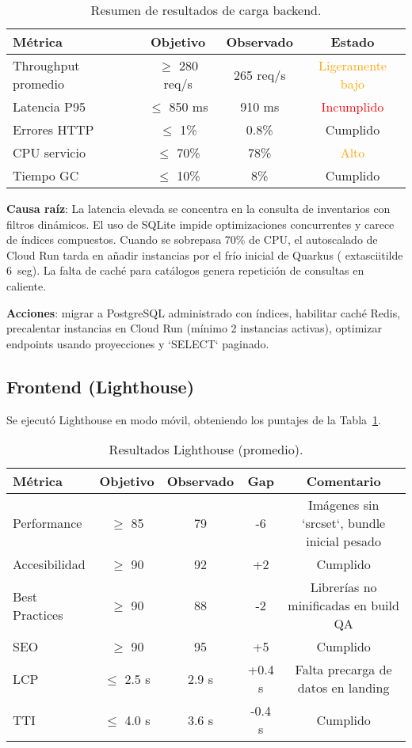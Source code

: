 \documentclass[12pt,letterpaper]{article}
\begin{document}
\begin{table}[H]
  \centering
  \caption{Resumen de resultados de carga backend.}
  \begin{tabular}{lccc}
    \toprule
    Métrica & Objetivo & Observado & Estado \\
    \midrule
    Throughput promedio & $\geq$ 280 req/s & 265 req/s & \textcolor{orange}{Ligeramente bajo} \\
    Latencia P95 & $\leq$ 850 ms & 910 ms & \textcolor{red}{Incumplido} \\
    Errores HTTP & $\leq$ 1\% & 0.8\% & \textcolor{green!60!black}{Cumplido} \\
    CPU servicio & $\leq$ 70\% & 78\% & \textcolor{orange}{Alto} \\
    Tiempo GC & $\leq$ 10\% & 8\% & \textcolor{green!60!black}{Cumplido} \\
    \bottomrule
  \end{tabular}
\end{table}

\textbf{Causa raíz}: La latencia elevada se concentra en la consulta de inventarios con filtros dinámicos. El uso de SQLite impide optimizaciones concurrentes y carece de índices compuestos. Cuando se sobrepasa 70\% de CPU, el autoscalado de Cloud Run tarda en añadir instancias por el frío inicial de Quarkus (	extasciitilde 6~seg). La falta de caché para catálogos genera repetición de consultas en caliente.

\textbf{Acciones}: migrar a PostgreSQL administrado con índices, habilitar caché Redis, precalentar instancias en Cloud Run (mínimo 2 instancias activas), optimizar endpoints usando proyecciones y `SELECT` paginado.

\subsection{Frontend (Lighthouse)}
Se ejecutó Lighthouse en modo móvil, obteniendo los puntajes de la Tabla~\ref{tab:lighthouse}.

\begin{table}[H]
  \centering
  \caption{Resultados Lighthouse (promedio).}\label{tab:lighthouse}
  \begin{tabular}{lcccc}
    \toprule
    Métrica & Objetivo & Observado & Gap & Comentario \\
    \midrule
    Performance & $\geq$ 85 & 79 & -6 & Imágenes sin `srcset`, bundle inicial pesado \\
    Accesibilidad & $\geq$ 90 & 92 & +2 & Cumplido \\
    Best Practices & $\geq$ 90 & 88 & -2 & Librerías no minificadas en build QA \\
    SEO & $\geq$ 90 & 95 & +5 & Cumplido \\
    LCP & $\leq$ 2.5 s & 2.9 s & +0.4 s & Falta precarga de datos en landing \\
    TTI & $\leq$ 4.0 s & 3.6 s & -0.4 s & Cumplido \\
    \bottomrule
  \end{tabular}
\end{table}
\end{document}
